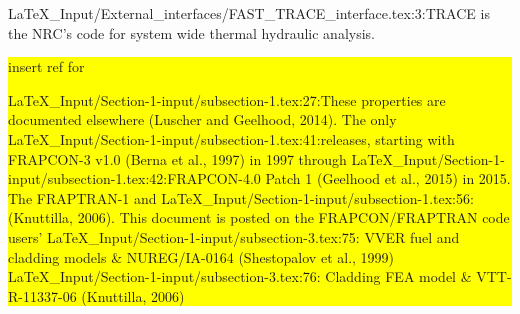 LaTeX_Input/External_interfaces/FAST_TRACE_interface.tex:3:TRACE is the NRC's code for system wide thermal hydraulic analysis.\colorbox{yellow}{insert ref for

LaTeX_Input/Section-1-input/subsection-1.tex:27:These properties are documented elsewhere (\colorbox{yellow}{Luscher and Geelhood, 2014}). The only
LaTeX_Input/Section-1-input/subsection-1.tex:41:releases, starting with FRAPCON-3 v1.0 (\colorbox{yellow}{Berna et al., 1997}) in 1997 through
LaTeX_Input/Section-1-input/subsection-1.tex:42:FRAPCON-4.0 Patch 1 (\colorbox{yellow}{Geelhood et al., 2015}) in 2015. The FRAPTRAN-1 and
LaTeX_Input/Section-1-input/subsection-1.tex:56:(\colorbox{yellow}{Knuttilla, 2006}). This document is posted on the FRAPCON/FRAPTRAN code users'
LaTeX_Input/Section-1-input/subsection-3.tex:75:            VVER fuel and cladding models 							&					 NUREG/IA-0164 (\colorbox{yellow}{Shestopalov et al., 1999})			\\\hline
LaTeX_Input/Section-1-input/subsection-3.tex:76:            Cladding FEA model 										&					 VTT-R-11337-06 (\colorbox{yellow}{Knuttilla, 2006})			        \\\hline

}
